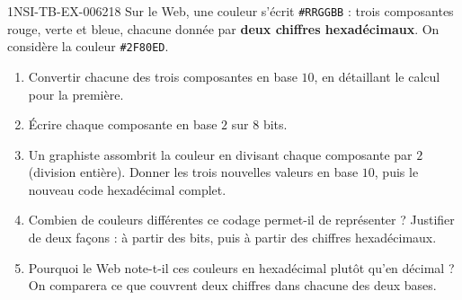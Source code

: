 \begin{exercice}{1NSI-TB-EX-006}{2}{18}
Sur le Web, une couleur s'écrit \lstinline{#RRGGBB} : trois composantes rouge,
verte et bleue, chacune donnée par \textbf{deux chiffres hexadécimaux}. On
considère la couleur \lstinline{#2F80ED}.
\begin{enumerate}
  \item Convertir chacune des trois composantes en base $10$, en détaillant le
    calcul pour la première.
  \item Écrire chaque composante en base $2$ sur $8$ bits.
  \item Un graphiste assombrit la couleur en divisant chaque composante par $2$
    (division entière). Donner les trois nouvelles valeurs en base $10$, puis le
    nouveau code hexadécimal complet.
  \item Combien de couleurs différentes ce codage permet-il de représenter ?
    Justifier de deux façons : à partir des bits, puis à partir des chiffres
    hexadécimaux.
  \item Pourquoi le Web note-t-il ces couleurs en hexadécimal plutôt qu'en
    décimal ? On comparera ce que couvrent deux chiffres dans chacune des deux
    bases.
\end{enumerate}
\end{exercice}
